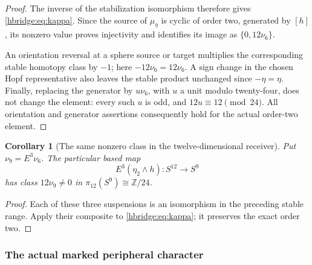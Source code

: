\documentclass[11pt]{article}
\newtheorem{corollary}[theorem]{Corollary}
\theoremstyle{definition}
\begin{document}
\begin{proof}
The inverse of the stabilization isomorphism therefore gives
\eqref{hbridge:eq:kappa}. Since the source of \(\mu_\eta\) is
cyclic of order two, generated by \([h]\), its nonzero value
proves injectivity and identifies its image as
\(\{0,12\nu_6\}\).

An orientation reversal at a sphere source or target multiplies
the corresponding stable homotopy class by \(-1\); here
\(-12\nu_6=12\nu_6\). A sign change in the chosen Hopf
representative also leaves the stable product unchanged since
\(-\eta=\eta\). Finally, replacing the generator by
\(u\nu_6\), with \(u\) a unit modulo twenty-four, does not
change the element: every such \(u\) is odd, and
\(12u\equiv12\pmod{24}\). All orientation and generator
assertions consequently hold for the actual order-two element.
\end{proof}

\begin{corollary}[The same nonzero class in the twelve-dimensional receiver]
Put \(\nu_9=E^3\nu_6\). The particular based map
\[
E^3(\eta_2\wedge h):S^{12}\longrightarrow S^9
\]
has class \(12\nu_9\ne0\) in
\(\pi_{12}(S^9)\cong\mathbb Z/24\).
\end{corollary}
\begin{proof}
Each of these three suspensions is an isomorphism in the preceding
stable range. Apply their composite to
\eqref{hbridge:eq:kappa}; it preserves the exact order two.
\end{proof}

\subsubsection{The actual marked peripheral character}
\end{document}
